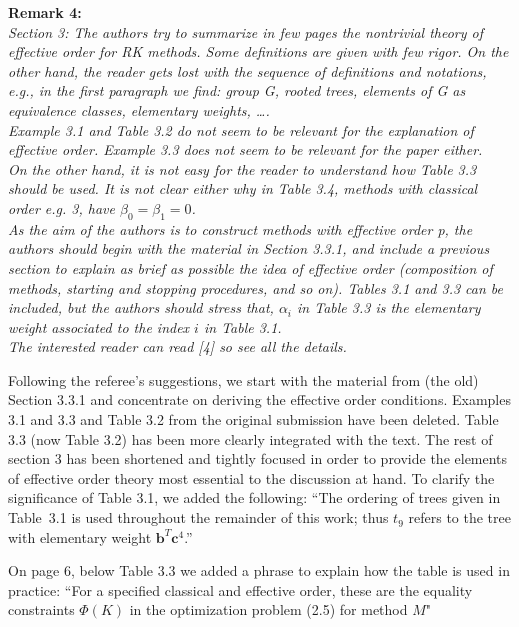 \documentclass[12pt]{article}
\newcommand{\remark}[2]{\vspace{25pt} \noindent \textbf{Remark #1:\newline} \textit{#2}\vspace{15pt}}
\renewcommand{\newline}{\vspace{15pt}\\}
\begin{document}
\remark{4}{
Section 3: The authors try to summarize in few pages the nontrivial theory of effective
order for RK methods. 
Some definitions are given with few rigor. 
On the other hand, the reader gets lost with the sequence of definitions and notations, 
e.g., in the first paragraph we find: group G, rooted trees, elements of G as equivalence 
classes, elementary weights, \dots.
\newline
Example 3.1 and Table 3.2 do not seem to be relevant for the explanation of effective
order. 
Example 3.3 does not seem to be relevant for the paper either.
\newline
On the other hand, it is not easy for the reader to understand how Table 3.3 should be
used. It is not clear either why in Table 3.4, methods with classical order e.g. 3, have
$\beta_0 = \beta_1 = 0$. \\
As the aim of the authors is to construct methods with effective order p, the authors
should begin with the material in Section 3.3.1, and include a previous section to explain
as brief as possible the idea of effective order (composition of methods, starting and
stopping procedures, and so on).
Tables 3.1 and 3.3 can be included, but the authors should stress that, $\alpha_i$ in 
Table 3.3 is the elementary weight associated to the index $i$ in Table 3.1.
\newline
The interested reader can read [4] so see all the details.}

Following the referee's suggestions, we start with the material from (the old) Section 3.3.1 and concentrate on deriving the effective order conditions.
Examples 3.1 and 3.3 and Table 3.2 from the original submission have been deleted.
Table 3.3 (now Table 3.2) has been more clearly integrated with the text.
The rest of section 3 has been shortened and tightly focused in order to provide the elements
of effective order theory most essential to the discussion at hand.
To clarify the significance of Table 3.1, we added the following:
``The ordering of trees given in Table~3.1 is used
throughout the remainder of this work; thus $t_9$ refers to the tree with
elementary weight $\bm{b}^T \bm{c}^4$.''

On page 6, below Table 3.3 we added a phrase to explain how the table is used in practice:
``For a specified classical and effective order, these are the equality constraints
$\Phi(K)$ in the optimization problem (2.5) for method $M$"
\end{document}
